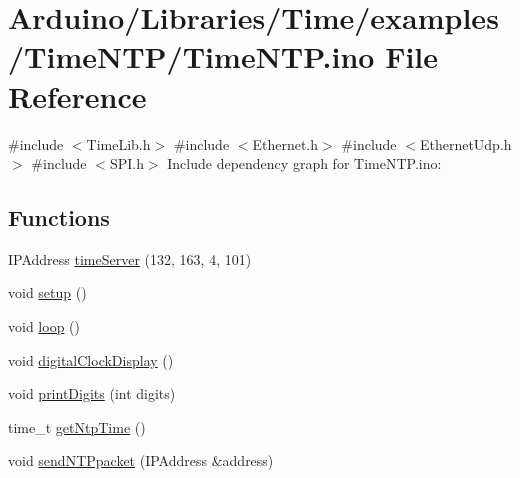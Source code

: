 \hypertarget{_time_n_t_p_8ino}{}\section{Arduino/\+Libraries/\+Time/examples/\+Time\+N\+T\+P/\+Time\+N\+TP.ino File Reference}
\label{_time_n_t_p_8ino}
{\ttfamily \#include $<$Time\+Lib.\+h$>$}\newline
{\ttfamily \#include $<$Ethernet.\+h$>$}\newline
{\ttfamily \#include $<$Ethernet\+Udp.\+h$>$}\newline
{\ttfamily \#include $<$S\+P\+I.\+h$>$}\newline
Include dependency graph for Time\+N\+T\+P.\+ino\+:
\subsection*{Functions}
\begin{DoxyCompactItemize}
\item 
I\+P\+Address \hyperlink{_time_n_t_p_8ino_a692f19597ee783ed4d1c0b2ad126d20e}{time\+Server} (132, 163, 4, 101)
\item 
void \hyperlink{_time_n_t_p_8ino_a4fc01d736fe50cf5b977f755b675f11d}{setup} ()
\item 
void \hyperlink{_time_n_t_p_8ino_afe461d27b9c48d5921c00d521181f12f}{loop} ()
\item 
void \hyperlink{_time_n_t_p_8ino_a01f3a72442d58926459c48afce4746e7}{digital\+Clock\+Display} ()
\item 
void \hyperlink{_time_n_t_p_8ino_a772afab0396032477ec7b01d14c774b2}{print\+Digits} (int digits)
\item 
time\+\_\+t \hyperlink{_time_n_t_p_8ino_a42ab384e77148282f4730ec6c68ac2a3}{get\+Ntp\+Time} ()
\item 
void \hyperlink{_time_n_t_p_8ino_a8ae1129fe8eab322ead67eaa83384ebc}{send\+N\+T\+Ppacket} (I\+P\+Address \&address)
\end{DoxyCompactItemize}
